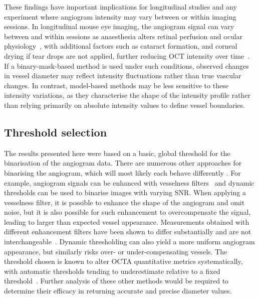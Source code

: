These findings have important implications for longitudinal studies and any experiment where angiogram intensity may vary between or within imaging sessions. In longitudinal mouse eye imaging, the angiogram signal can vary between and within sessions as anaesthesia alters retinal perfusion and ocular physiology~\cite{wormRetinalOCTParameters2026,fengHighresolutionStructuralFunctional2023}, with additional factors such as cataract formation, and corneal drying if tear drops are not applied, further reducing OCT intensity over time~\cite{steinEffectCornealDrying2006,mclellanOpticalCoherenceTomography2012}. If a binary-mask-based method is used under such conditions, observed changes in vessel diameter may reflect intensity fluctuations rather than true vascular changes. In contrast, model-based methods may be less sensitive to these intensity variations, as they characterise the shape of the intensity profile rather than relying primarily on absolute intensity values to define vessel boundaries.

\subsection{Threshold selection}
\label{subsec:threshold_selection}
The results presented here were based on a basic, global threshold for the binarisation of the angiogram data. There are numerous other approaches for binarising the angiogram, which will most likely each behave differently \cite{mehtaImpactBinarizationThresholding2019,rabioloComparisonMethodsQuantify2018,borrelliOPTICALCOHERENCETOMOGRAPHY2021,freedmanImpactImageProcessing2022,arrigoImpactDifferentThresholds2021}. For example, angiogram signals can be enhanced with vesselness filters~\cite{frangiMultiscaleVesselEnhancement1998} and dynamic thresholds can be used to binarise images with varying SNR. When applying a vesselness filter, it is possible to enhance the shape of the angiogram and omit noise, but it is also possible for such enhancement to overcompensate the signal, leading to larger than expected vessel appearance. Measurements obtained with different enhancement filters have been shown to differ substantially and are not interchangeable~\cite{hongEffectVesselEnhancement2020}. Dynamic thresholding can also yield a more uniform angiogram appearance, but similarly risks over- or under-compensating vessels. The threshold chosen is known to alter OCTA quantitative metrics systematically, with automatic thresholds tending to underestimate relative to a fixed threshold~\cite{mehtaImpactBinarizationThresholding2019,arrigoImpactDifferentThresholds2021}. Further analysis of these other methods would be required to determine their efficacy in returning accurate and precise diameter values.

